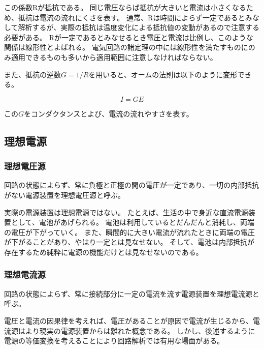 \documentclass{ltjsreport}
\begin{document}
この係数Rが抵抗である。
同じ電圧ならば抵抗が大きいと電流は小さくなるため、抵抗は電流の流れにくさを表す。
通常、Rは時間によらず一定であるとみなして解析するが、実際の抵抗は温度変化による抵抗値の変動があるので注意する必要がある。
Rが一定であるとみなせるとき電圧と電流は比例し、このような関係は線形性とよばれる。
電気回路の諸定理の中には線形性を満たすものにのみ適用できるものも多いから適用範囲に注意しなければならない。



また、抵抗の逆数$G = 1/R$を用いると、オームの法則は以下のように変形できる。

\begin{equation}
  I = GE
\end{equation}

この$G$をコンダクタンスとよび、電流の流れやすさを表す。

\subsection{理想電源}

\subsubsection{理想電圧源}
回路の状態によらず、常に負極と正極の間の電圧が一定であり、一切の内部抵抗がない電源装置を理想電圧源と呼ぶ。

実際の電源装置は理想電源ではない。
たとえば、生活の中で身近な直流電源装置として、電池があげられる。
電池は利用しているとだんだんと消耗し、両端の電圧が下がっていく。
また、瞬間的に大きい電流が流れたときに両端の電圧が下がることがあり、やはり一定とは見なせない。
そして、電池は内部抵抗が存在するため純粋に電源の機能だけとは見なせないのである。

\subsubsection{理想電流源}
回路の状態によらず、常に接続部分に一定の電流を流す電源装置を理想電流源と呼ぶ。

電圧と電流の因果律を考えれば、電圧があることが原因で電流が生じるから、電流源はより現実の電源装置からは離れた概念である。
しかし、後述するように電源の等価変換を考えることにより回路解析では有用な場面がある。
\end{document}
